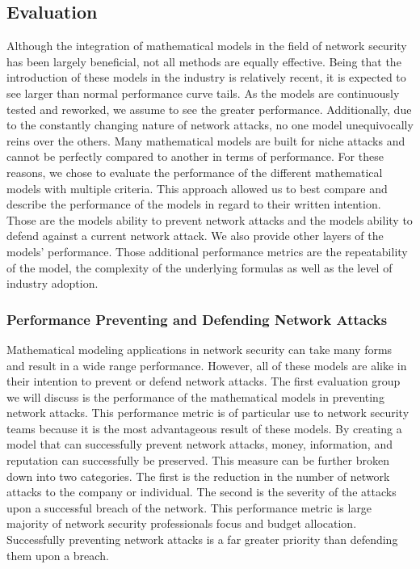 \documentclass{article}
\begin{document}
\subsection{Evaluation}
Although the integration of mathematical models in the field of network security has been largely beneficial, not all methods are equally effective. Being that the introduction of these models in the industry is relatively recent, it is expected to see larger than normal performance curve tails. As the models are continuously tested and reworked, we assume to see the greater performance. Additionally, due to the constantly changing nature of network attacks, no one model unequivocally reins over the others. Many mathematical models are built for niche attacks and cannot be perfectly compared to another in terms of performance. For these reasons, we chose to evaluate the performance of the different mathematical models with multiple criteria. This approach allowed us to best compare and describe the performance of the models in regard to their written intention. Those are the models ability to prevent network attacks and the models ability to defend against a current network attack. We also provide other layers of the models’ performance. Those additional performance metrics are the repeatability of the model, the complexity of the underlying formulas as well as the level of industry adoption.

\subsubsection{Performance Preventing and Defending Network Attacks }
Mathematical modeling applications in network security can take many forms and result in a wide range performance. However, all of these models are alike in their intention to prevent or defend network attacks. The first evaluation group we will discuss is the performance of the mathematical models in preventing network attacks. This performance metric is of particular use to network security teams because it is the most advantageous result of these models. By creating a model that can successfully prevent network attacks, money, information, and reputation can successfully be preserved. This measure can be further broken down into two categories. The first is the reduction in the number of network attacks to the company or individual. The second is the severity of the attacks upon a successful breach of the network. This performance metric is large majority of network security professionals focus and budget allocation. Successfully preventing network attacks is a far greater priority than defending them upon a breach.
\end{document}
